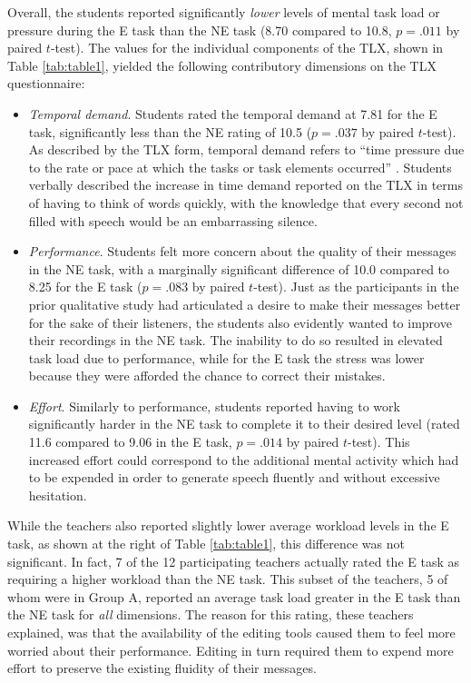 Overall, the students reported significantly \emph{lower} levels of mental task load or pressure during the E task than the NE task (8.70 compared to 10.8, $p=.011$ by paired $t$-test). 
The values for the individual components of the TLX, shown in Table \ref{tab:table1}, yielded the following contributory dimensions on the TLX questionnaire:

\begin{itemize}
	\item \emph{Temporal demand}. Students rated the temporal demand at 7.81 for the E task, significantly less than the NE rating of 10.5 ($p=.037$ by paired $t$-test). 
	As described by the TLX form, temporal demand refers to ``time pressure due to the rate or pace at which the tasks or task elements occurred'' \cite{nasatlx}.
	Students verbally described the increase in time demand reported on the TLX in terms of having to think of words quickly, with the knowledge that every second not filled with speech would be an embarrassing silence.
	\item \emph{Performance}. Students felt more concern about the quality of their messages in the NE task, with a marginally significant difference of 10.0 compared to 8.25 for the E task ($p=.083$ by paired $t$-test). 
	Just as the participants in the prior qualitative study had articulated a desire to make their messages better for the sake of their listeners, the students also evidently wanted to improve their recordings in the NE task. 
	The inability to do so resulted in elevated task load due to performance, while for the E task the stress was lower because they were afforded the chance to correct their mistakes.
	\item \emph{Effort}. Similarly to performance, students reported having to work significantly harder in the NE task to complete it to their desired level (rated 11.6 compared to 9.06 in the E task, $p=.014$ by paired $t$-test). 
	This increased effort could correspond to the additional mental activity which had to be expended in order to generate speech fluently and without excessive hesitation.
\end{itemize}

While the teachers also reported slightly lower average workload levels in the E task, as shown at the right of Table \ref{tab:table1}, this difference was not significant.
In fact, 7 of the 12 participating teachers actually rated the E task as requiring a higher workload than the NE task.
This subset of the teachers, 5 of whom were in Group A, reported an average task load greater in the E task than the NE task for \emph{all} dimensions.
The reason for this rating, these teachers explained, was that the availability of the editing tools caused them to feel more worried about their performance.
Editing in turn required them to expend more effort to preserve the existing fluidity of their messages.

